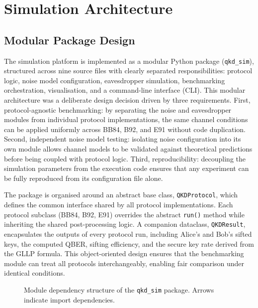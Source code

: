 \documentclass[10pt, a4paper]{report}
\begin{document}
\section{Simulation Architecture}


\subsection{Modular Package Design}

The simulation platform is implemented as a modular Python package (\texttt{qkd\_sim}), structured across nine source files with clearly separated responsibilities: protocol logic, noise model configuration, eavesdropper simulation, benchmarking orchestration, visualisation, and a command-line interface (CLI). This modular architecture was a deliberate design decision driven by three requirements. First, protocol-agnostic benchmarking: by separating the noise and eavesdropper modules from individual protocol implementations, the same channel conditions can be applied uniformly across BB84, B92, and E91 without code duplication. Second, independent noise model testing: isolating noise configuration into its own module allows channel models to be validated against theoretical predictions before being coupled with protocol logic. Third, reproducibility: decoupling the simulation parameters from the execution code ensures that any experiment can be fully reproduced from its configuration file alone.

The package is organised around an abstract base class, \texttt{QKDProtocol}, which defines the common interface shared by all protocol implementations. Each protocol subclass (BB84, B92, E91) overrides the abstract \texttt{run()} method while inheriting the shared post-processing logic. A companion dataclass, \texttt{QKDResult}, encapsulates the outputs of every protocol run, including Alice's and Bob's sifted keys, the computed QBER, sifting efficiency, and the secure key rate derived from the GLLP formula. This object-oriented design ensures that the benchmarking module can treat all protocols interchangeably, enabling fair comparison under identical conditions.

\begin{figure}[ht]
    \centering
    \caption{Module dependency structure of the \texttt{qkd\_sim} package. Arrows indicate import dependencies.}
    \label{fig:architecture}
\end{figure}
\end{document}
